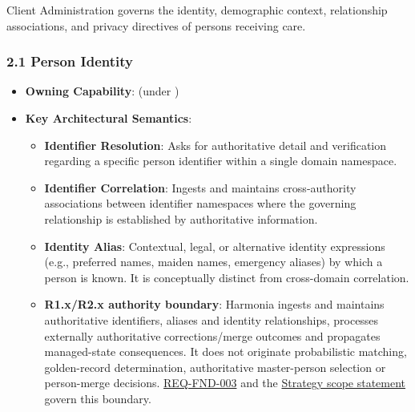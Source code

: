 Client Administration governs the identity, demographic context, relationship associations, and privacy directives of persons receiving care.

\label{rad:em:15}
\subsubsection*{2.1 Person Identity}
\label{rad:em:16}

\begin{itemize}

\item 
\textbf{Owning Capability}: \texttt{} (under \texttt{})



\item 
\textbf{Key Architectural Semantics}:


\begin{itemize}

\item 
\textbf{Identifier Resolution}: Asks for authoritative detail and verification regarding a specific person identifier within a single domain namespace.



\item 
\textbf{Identifier Correlation}: Ingests and maintains cross-authority associations between identifier namespaces where the governing relationship is established by authoritative information.



\item 
\textbf{Identity Alias}: Contextual, legal, or alternative identity expressions (e.g., preferred names, maiden names, emergency aliases) by which a person is known. It is conceptually distinct from cross-domain correlation.



\item 
\textbf{R1.x/\allowbreak{}R2.x authority boundary}: Harmonia ingests and maintains authoritative identifiers, aliases and identity relationships, processes externally authoritative corrections/\allowbreak{}merge outcomes and propagates managed-state consequences. It does not originate probabilistic matching, golden-record determination, authoritative master-person selection or person-merge decisions. \href{https://github.com/fhirfactory/harmonia/blob/98410db60155198a75f74c79d98060070209faa1/docs/markdown/01-motivation/requirements-constraints/foundational-requirements.md\#req-fnd-003-subject-referential-integrity}{REQ-FND-003} and the \hyperref[rad:enabling:59]{Strategy scope statement} govern this boundary.




\end{itemize}
\end{itemize}
